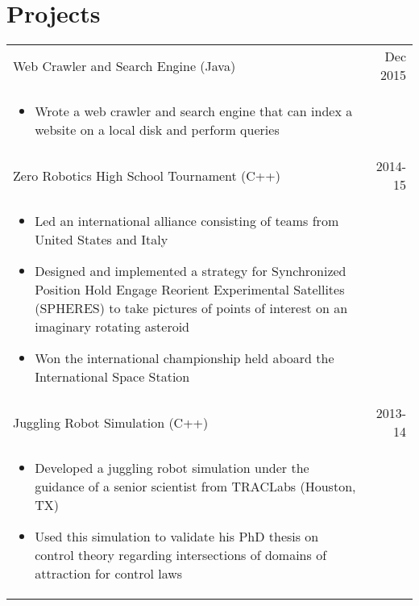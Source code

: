 \documentclass[9pt]{extarticle}
\begin{document}
\section*{Projects}
\begin{tabularx}{\textwidth}{X r }
    Web Crawler and Search Engine (Java) & Dec 2015 \\
    \vspace{-2mm}
    \begin{itemize}[noitemsep,topsep=0pt]
        \item Wrote a web crawler and search engine that can index a website on a
                local disk and perform queries
    \end{itemize} & \\
    Zero Robotics High School Tournament (C++) & 2014-15 \\
    \vspace{-2mm}
    \begin{itemize}[noitemsep,topsep=0pt]
        \item Led an international alliance consisting of teams from United States and Italy
        \item Designed and implemented a strategy for Synchronized Position Hold Engage
                Reorient Experimental Satellites (SPHERES) to take pictures of points of
                interest on an imaginary rotating asteroid
        \item Won the international championship held aboard the International Space Station
    \end{itemize} & \\
    Juggling Robot Simulation (C++) & 2013-14 \\
    \vspace{-2mm}
    \begin{itemize}[noitemsep,topsep=0pt]
        \item Developed a juggling robot simulation under the guidance of a senior
                scientist from TRACLabs (Houston, TX)
        \item Used this simulation to validate his PhD thesis on control theory
                regarding intersections of domains of attraction for control laws
    \end{itemize} & \\
\end{tabularx}
\end{document}
